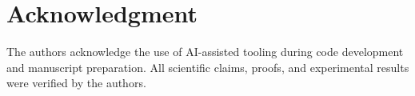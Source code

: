 \documentclass[conference]{IEEEtran}
\begin{document}
















\section*{Acknowledgment}
The authors acknowledge the use of AI-assisted tooling during code development and manuscript preparation. All scientific claims, proofs, and experimental results were verified by the authors.



\end{document}
